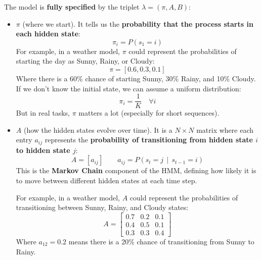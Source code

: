 \highspace
The model is \textbf{fully specified} by the triplet $\lambda = (\pi, A, B)$:
\begin{itemize}
    \item {} $\pi$ (where we start). It tells us the \textbf{probability that the process starts in each hidden state}:
    \begin{equation*}
        \pi_i = P \left(s_1 = i\right)
    \end{equation*}
    For example, in a weather model, $\pi$ could represent the probabilities of starting the day as Sunny, Rainy, or Cloudy:
    \begin{equation*}
        \pi = \left[0.6, 0.3, 0.1\right]
    \end{equation*}
    Where there is a 60\% chance of starting Sunny, 30\% Rainy, and 10\% Cloudy. If we don't know the initial state, we can assume a uniform distribution:
    \begin{equation*}
        \pi_i = \frac{1}{K} \quad \forall i
    \end{equation*}
    But in real tasks, $\pi$ matters a lot (especially for short sequences).


    \item {} $A$ (how the hidden states evolve over time). It is a $N \times N$ matrix where each entry $a_{ij}$ represents the \textbf{probability of transitioning from hidden state $i$ to hidden state $j$}:
    \begin{equation*}
        A = \left[a_{ij}\right] \qquad
        a_{ij} = P\left(s_{t} = j \, \mid \, s_{t-1} = i\right)
    \end{equation*}
    This is the \textbf{Markov Chain} component of the HMM, defining how likely it is to move between different hidden states at each time step.

    For example, in a weather model, $A$ could represent the probabilities of transitioning between Sunny, Rainy, and Cloudy states:
    \begin{equation*}
        A = \begin{bmatrix}
            0.7 & 0.2 & 0.1 \\
            0.4 & 0.5 & 0.1 \\
            0.3 & 0.3 & 0.4
        \end{bmatrix}
    \end{equation*}
    Where $a_{12} = 0.2$ means there is a 20\% chance of transitioning from Sunny to Rainy.



\end{itemize}
